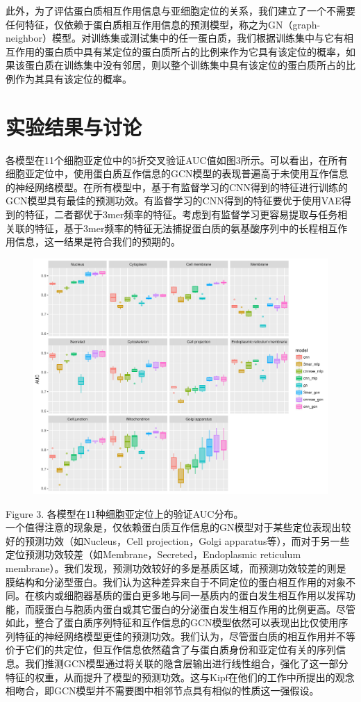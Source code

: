\documentclass[a4paper,UTF8]{article}
\begin{document}
此外，为了评估蛋白质相互作用信息与亚细胞定位的关系，我们建立了一个不需要任何特征，仅依赖于蛋白质相互作用信息的预测模型，称之为GN（graph-neighbor）模型。对训练集或测试集中的任一蛋白质，我们根据训练集中与它有相互作用的蛋白质中具有某定位的蛋白质所占的比例来作为它具有该定位的概率，如果该蛋白质在训练集中没有邻居，则以整个训练集中具有该定位的蛋白质所占的比例作为其具有该定位的概率。

\section{实验结果与讨论}

各模型在11个细胞亚定位中的5折交叉验证AUC值如图3所示。可以看出，在所有细胞亚定位中，使用蛋白质互作信息的GCN模型的表现普遍高于未使用互作信息的神经网络模型。在所有模型中，基于有监督学习的CNN得到的特征进行训练的GCN模型具有最佳的预测功效。有监督学习的CNN得到的特征要优于使用VAE得到的特征，二者都优于3mer频率的特征。考虑到有监督学习更容易提取与任务相关联的特征，基于3mer频率的特征无法捕捉蛋白质的氨基酸序列中的长程相互作用信息，这一结果是符合我们的预期的。

\begin{figure}[H]
	\centering\includegraphics[scale=0.7]{../result/test_performance_AUC.pdf}
\end{figure}
Figure 3. 各模型在11种细胞亚定位上的验证AUC分布。\\

一个值得注意的现象是，仅依赖蛋白质互作信息的GN模型对于某些定位表现出较好的预测功效（如Nucleus，Cell projection，Golgi apparatus等），而对于另一些定位预测功效较差（如Membrane，Secreted，Endoplasmic reticulum membrane）。我们发现，预测功效较好的多是基质区域，而预测功效较差的则是膜结构和分泌型蛋白。我们认为这种差异来自于不同定位的蛋白相互作用的对象不同。在核内或细胞器基质的蛋白更多地与同一基质内的蛋白发生相互作用以发挥功能，而膜蛋白与胞质内蛋白或其它蛋白的分泌蛋白发生相互作用的比例更高。尽管如此，整合了蛋白质序列特征和互作信息的GCN模型依然可以表现出比仅使用序列特征的神经网络模型更佳的预测功效。我们认为，尽管蛋白质的相互作用并不等价于它们的共定位，但互作信息依然蕴含了与蛋白质身份和亚定位有关的序列信息。我们推测GCN模型通过将关联的隐含层输出进行线性组合，强化了这一部分特征的权重，从而提升了模型的预测功效。这与Kipf在他们的工作中所提出的观念相吻合，即GCN模型并不需要图中相邻节点具有相似的性质这一强假设。
\end{document}
